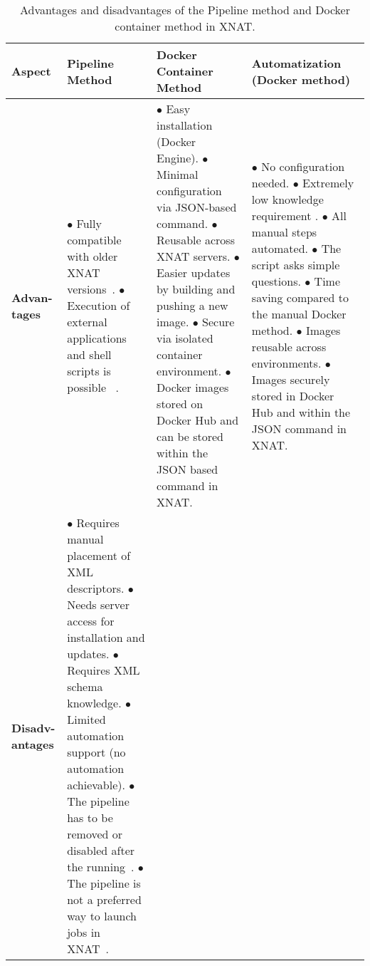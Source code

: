 \begin{table}[htbp]
\centering
\caption{Advantages and disadvantages of the Pipeline method and Docker container method in XNAT.}
\label{tab:adv-disadv}
\renewcommand{\arraystretch}{4}
\begin{tabular}{|p{1cm}|p{3cm}|p{5cm}|p{4cm}|}
\hline
\textbf{Aspect} & \textbf{Pipeline Method} & \textbf{Docker Container Method} & \textbf{Automatization (Docker method)} \\
\hline
\textbf{Advan-tages} &
\parbox[t]{3cm}{
$\bullet$ Fully compatible with older XNAT versions~\cite{Pipelinecompatible}.\\
$\bullet$ Execution of external applications and shell scripts is possible ~\cite{jansen_extending_2015}.
}
&
\parbox[t]{5cm}{
$\bullet$ Easy installation (Docker Engine). \\
$\bullet$ Minimal configuration via JSON-based command.\\
$\bullet$ Reusable across XNAT servers. \\
$\bullet$ Easier updates by building and pushing a new image. \\
$\bullet$ Secure via isolated container environment. \\
$\bullet$ Docker images stored on Docker Hub and can be stored within the JSON based command in XNAT.\\
}
&
\parbox[t]{3cm}{
$\bullet$ No configuration needed. \\
$\bullet$ Extremely low knowledge requirement . \\
$\bullet$ All manual steps automated. \\
$\bullet$ The script asks simple questions. \\
$\bullet$ Time saving compared to the manual Docker method. \\
$\bullet$ Images reusable across environments. \\
$\bullet$ Images securely stored in Docker Hub and within the JSON command in XNAT.\\
} \\
\hline
\textbf{Disadv-antages} &
\parbox[t]{3cm}{
$\bullet$ Requires manual placement of XML descriptors.\\
$\bullet$ Needs server access for installation and updates.\\
$\bullet$ Requires XML schema knowledge.\\
$\bullet$ Limited automation support (no automation achievable).\\
$\bullet$ The pipeline has to be removed or disabled after the running~\cite{addingpipeline}.\\
$\bullet$ The pipeline is not a preferred way to launch jobs in XNAT~\cite{pipepreference}.\\

}
\end{tabular}
\end{table}
